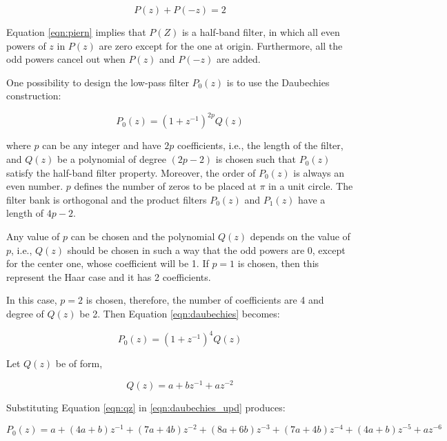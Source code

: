  \begin{equation}\label{eqn:piern} 
 {P(z) + P(-z) =  2}
 \end{equation}
 
 Equation \ref{eqn:piern} implies that $P(Z)$ is a half-band filter, in which all even powers of $z$ in $P(z)$ are zero except for the one at origin. Furthermore, all the odd powers cancel out when $P(z)$ and $P(-z)$ are added. 
 
 
 One possibility to design the low-pass filter $P_0(z)$ is to use the Daubechies construction:
 
 \begin{equation}\label{eqn:daubechies} 
 {P_0(z) = (1 + z^{-1})^{2p}Q(z)}
 \end{equation}
 
where $p$ can be any integer and have $2p$ coefficients, i.e., the length of the filter, and $Q(z)$ be a polynomial of degree $(2p-2)$ is chosen such that $P_0(z)$ satisfy  the half-band filter property. Moreover, the order of $P_0(z)$ is always an even number. $p$ defines the number of zeros to be placed at $\pi$ in a unit circle. The filter bank is orthogonal and the product filters $P_0(z)$ and $P_1(z)$ have a length of $4p-2$. 

Any value of $p$ can be chosen and the polynomial $Q(z)$ depends on the value of $p$, i.e., $Q(z)$ should be chosen in such a way that the odd powers are 0, except for the center one, whose coefficient will be 1. If $p=1$ is chosen, then this represent the Haar case and it has 2 coefficients.

In this case, $p=2$ is chosen, therefore, the number of coefficients are 4 and degree of $Q(z)$ be 2. Then Equation \ref{eqn:daubechies} becomes:

 \begin{equation}\label{eqn:daubechies_upd} 
{P_0(z) = (1 + z^{-1})^{4}Q(z)}
\end{equation}

Let $Q(z)$ be of form,

 \begin{equation}\label{eqn:qz} 
{Q(z) = a+bz^{-1}+az^{-2}}
\end{equation}


Substituting Equation \ref{eqn:qz} in \ref{eqn:daubechies_upd} produces:

 \begin{equation}\label{eqn:producer} 
{P_0(z) = a + (4a+b)z^{-1} + (7a + 4b)z^{-2} + (8a+6b)z^{-3} + (7a+4b)z^{-4} + (4a+b)z^{-5} + az^{-6}}
\end{equation}

